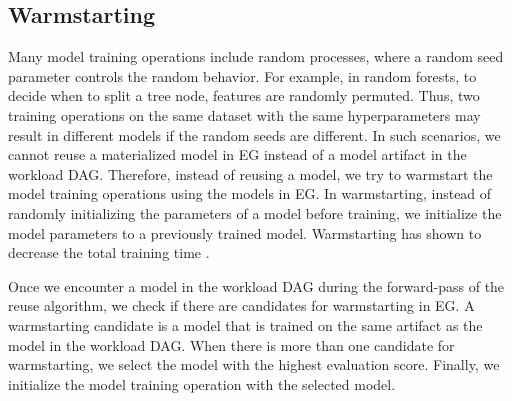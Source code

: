 \subsection{Warmstarting}
Many model training operations include random processes, where a random seed parameter controls the random behavior.
For example, in random forests, to decide when to split a tree node, features are randomly permuted.
Thus, two training operations on the same dataset with the same hyperparameters may result in different models if the random seeds are different.
In such scenarios, we cannot reuse a materialized model in EG instead of a model artifact in the workload DAG.
Therefore, instead of reusing a model, we try to warmstart the model training operations using the models in EG.
In warmstarting, instead of randomly initializing the parameters of a model before training, we initialize the model parameters to a previously trained model.
Warmstarting has shown to decrease the total training time \cite{baylor2017tfx}.

Once we encounter a model in the workload DAG during the forward-pass of the reuse algorithm, we check if there are candidates for warmstarting in EG.
A warmstarting candidate is a model that is trained on the same artifact as the model in the workload DAG.
When there is more than one candidate for warmstarting, we select the model with the highest evaluation score.
Finally, we initialize the model training operation with the selected model.